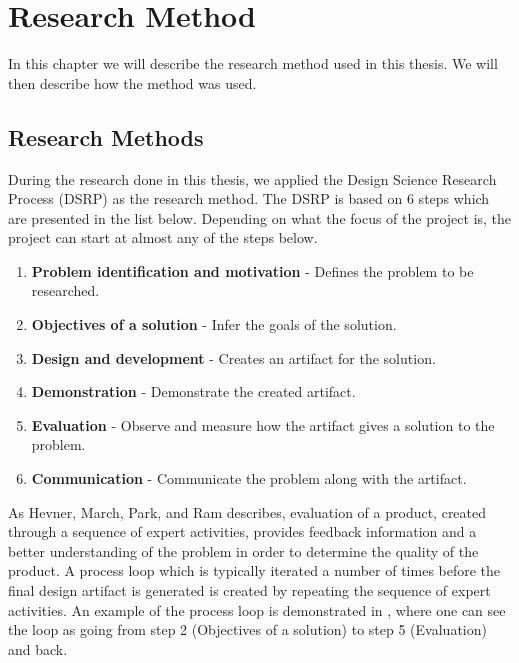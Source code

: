 
\chapter{Research Method} %
\label{cha:research_questions_and_method}
In this chapter we will describe the research method used in this 
thesis. We will then describe how the method was used.
\section{Research Methods} %
\label{sec:research_method}

During the research done in this thesis, we applied the Design Science Research 
Process (DSRP) as the research method. The DSRP is based on 6 steps which are 
presented in the list below. Depending on what the focus of the project is, 
the project can start at almost any of the steps below. \cite{peffers2006design}

\begin{enumerate}
	\item \textbf{Problem identification and motivation} - Defines the problem to be
	researched. 
	\item \textbf{Objectives of a solution} - Infer the goals of the solution.
	\item \textbf{Design and development} - Creates an artifact for the solution.
	\item \textbf{Demonstration} - Demonstrate the created artifact.
	\item \textbf{Evaluation} - Observe and measure how the artifact gives a 
	solution to the problem.
	\item \textbf{Communication} - Communicate the problem along with the artifact.
\end{enumerate}

As Hevner, March, Park, and Ram \cite{von2004design} describes, 
evaluation of a product, created through a sequence of expert activities, 
provides feedback information and a better understanding of the problem in 
order to determine the quality of the product. A process loop which is typically 
iterated a number of times before the final design artifact is generated is created 
by repeating the sequence of expert activities. An example of the process loop 
is demonstrated in , where one can see the loop as going 
from step 2 (Objectives of a solution) to step 5 (Evaluation) and back.\\

